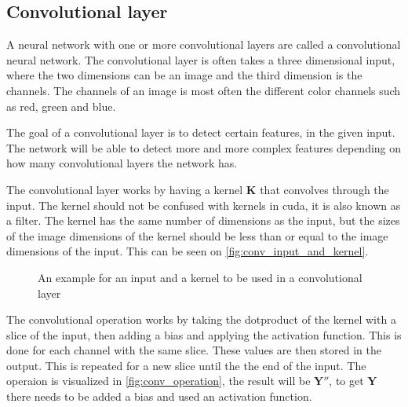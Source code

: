 \subsection{Convolutional layer}

A neural network with one or more convolutional layers are called a convolutional neural network.
The convolutional layer is often takes a three dimensional input, where the two dimensions can be an image and the third dimension is the channels. The channels of an image is most often the different color channels such as red, green and blue.

The goal of a convolutional layer is to detect certain features, in the given input. The network will be able to detect more and more complex features depending on how many convolutional layers the network has.

The convolutional layer works by having a kernel $\bm{K}$ that convolves through the input. The kernel should not be confused with kernels in cuda, it is also known as a filter. The kernel has the same number of dimensions as the input, but the sizes of the image dimensions of the kernel should be less than or equal to the image dimensions of the input. This can be seen on \autoref{fig:conv_input_and_kernel}.

\begin{figure}
    \centering
    \hfill
    \hfill
    \hfill
    \null
    \caption{An example for an input and a kernel to be used in a convolutional layer}
    \label{fig:conv_input_and_kernel}
\end{figure}


The convolutional operation works by taking the dotproduct of the kernel with a slice of the input, then adding a bias and applying the activation function. This is done for each channel with the same slice. These values are then stored in the output. This is repeated for a new slice until the the end of the input. The operaion is visualized in \autoref{fig:conv_operation}, the result will be $\bm{Y}''$, to get $\bm{Y}$ there needs to be added a bias and used an activation function.

